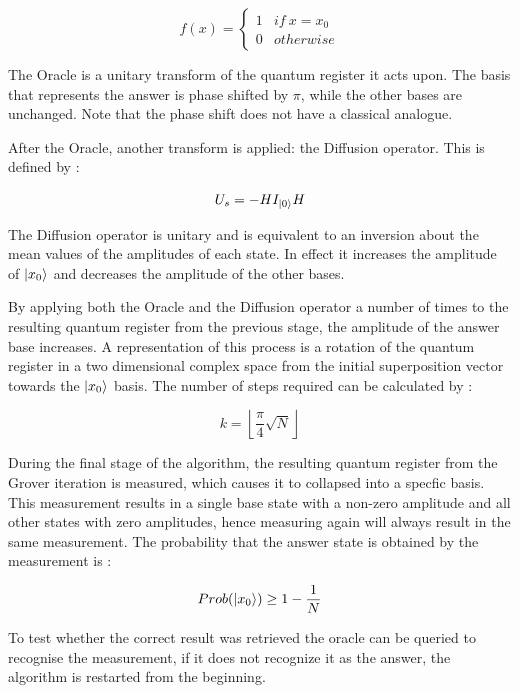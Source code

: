 \begin{equation}
 f(x) = \left\{
	\begin{array}{lr}
		1 & if \: x = x_0 \\
		0 & otherwise
	\end{array}
	\right.
\end{equation}

The Oracle is a unitary transform of the quantum register it acts upon. The basis that represents the answer is phase shifted by \(\pi\), while the other bases are unchanged. Note that the phase shift does not have a classical analogue.

After the Oracle, another transform is applied: the Diffusion operator. This is defined by \cite{lomo2000}:

\begin{equation}
 U_s = -HI_{\left| 0 \right>}H
\end{equation}

The Diffusion operator is unitary and is equivalent to an inversion about the mean values of the amplitudes of each state. In effect it increases the amplitude of \(\left| x_0 \right>\) and decreases the amplitude of the other bases.

By applying both the Oracle and the Diffusion operator a number of times to the resulting quantum register from the previous stage, the amplitude of the answer base increases. A representation of this process is a rotation of the quantum register in a two dimensional complex space from the initial superposition vector towards the \(\left| x_0 \right>\) basis. The number of steps required can be calculated by \cite{lomo2000}:

\begin{equation}
 k = \left \lfloor\frac{\pi}{4}\sqrt{N} \right \rfloor
\end{equation}

During the final stage of the algorithm, the resulting quantum register from the Grover iteration is measured, which causes it to collapsed into a specfic basis. This measurement results in a single base state with a non-zero amplitude and all other states with zero amplitudes, hence measuring again will always result in the same measurement. The probability that the answer state is obtained by the measurement is \cite{lomo2000}:

\begin{equation}
 Prob(\left| x_0 \right>) \geq 1 - \frac{1}{N}
\end{equation}

To test whether the correct result was retrieved the oracle can be queried to recognise the measurement, if it does not recognize it as the answer, the algorithm is restarted from the beginning.


